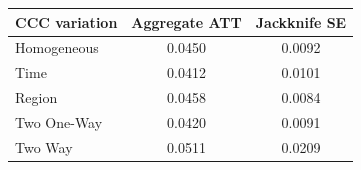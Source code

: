 \begin{tabular}{lcc}
\hline
CCC variation & Aggregate ATT & Jackknife SE \\
\hline
Homogeneous & 0.0450 & 0.0092 \\
Time & 0.0412 & 0.0101 \\
Region & 0.0458 & 0.0084 \\
Two One-Way & 0.0420 & 0.0091 \\
Two Way & 0.0511 & 0.0209 \\
\hline\hline
\end{tabular}
